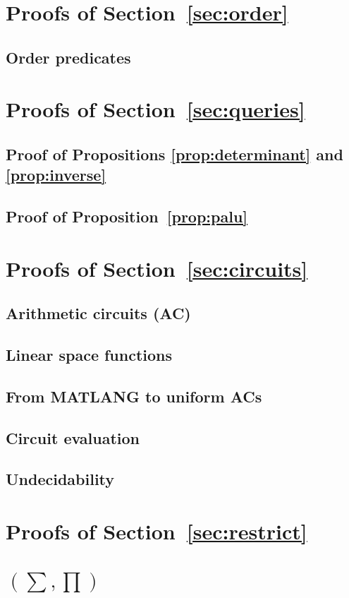 
\section{Proofs of Section~\ref{sec:order}}

\subsection{Order predicates}



\section{Proofs of Section~\ref{sec:queries}}

\subsection{Proof of Propositions \ref{prop:determinant} and \ref{prop:inverse}}


\subsection{Proof of Proposition~\ref{prop:palu}}



\section{Proofs of Section~\ref{sec:circuits}}

\subsection{Arithmetic circuits (AC)}


\subsection{Linear space functions}


\subsection{From MATLANG to uniform ACs}


\subsection{Circuit evaluation}


\subsection{Undecidability}



\section{Proofs of Section~\ref{sec:restrict}}



\section{\lang$(\sum,\prod)$}


